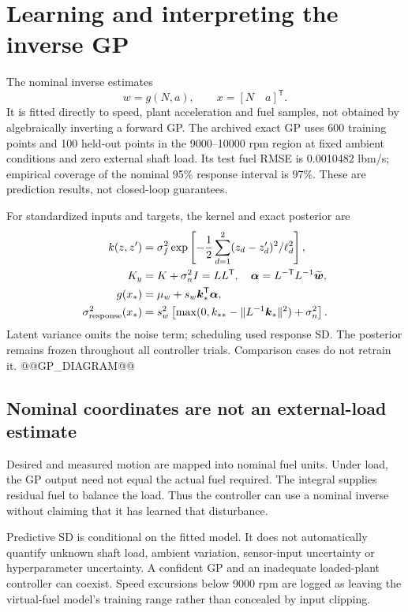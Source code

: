 \section{Learning and interpreting the inverse GP}
The nominal inverse estimates
\begin{equation}w=g(N,a),\qquad x=[N\quad a]^{\mathsf T}.\end{equation}
It is fitted directly to speed, plant acceleration and fuel samples, not obtained by algebraically inverting a forward GP. The archived exact GP uses 600 training points and 100 held-out points in the 9000--10000 rpm region at fixed ambient conditions and zero external shaft load. Its test fuel RMSE is 0.0010482 lbm/s; empirical coverage of the nominal 95\% response interval is 97\%. These are prediction results, not closed-loop guarantees.

For standardized inputs and targets, the kernel and exact posterior are~\cite{gpml}
\begin{align}
k(z,z')&=\sigma_f^2\exp\left[-\frac12\sum_{d=1}^2(z_d-z'_d)^2/\ell_d^2\right],\\
K_y&=K+\sigma_n^2I=LL^{\mathsf T},\quad
\boldsymbol\alpha=L^{-\mathsf T}L^{-1}\widetilde{\boldsymbol w},\\
g(x_*)&=\mu_w+s_w\boldsymbol k_*^{\mathsf T}\boldsymbol\alpha,\\
\sigma_{\rm response}^2(x_*)&=s_w^2\left[\max(0,k_{**}-\|L^{-1}\boldsymbol k_*\|^2)+\sigma_n^2\right].
\label{eq:gpvar}
\end{align}
Latent variance omits the noise term; scheduling used response SD. The posterior remains frozen throughout all controller trials. Comparison cases do not retrain it.
@@GP_DIAGRAM@@

\subsection{Nominal coordinates are not an external-load estimate}
Desired and measured motion are mapped into nominal fuel units. Under load, the GP output need not equal the actual fuel required. The integral supplies residual fuel to balance the load. Thus the controller can use a nominal inverse without claiming that it has learned that disturbance.

Predictive SD is conditional on the fitted model. It does not automatically quantify unknown shaft load, ambient variation, sensor-input uncertainty or hyperparameter uncertainty. A confident GP and an inadequate loaded-plant controller can coexist. Speed excursions below 9000 rpm are logged as leaving the virtual-fuel model's training range rather than concealed by input clipping.

